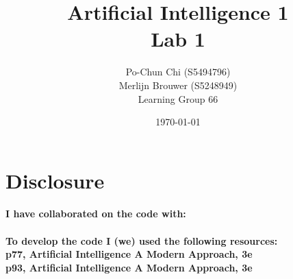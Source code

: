 \documentclass{article}
\title{{\bf Artificial Intelligence 1} \\ Lab 1}%
\author{
Po-Chun Chi (S5494796)
\\
Merlijn Brouwer (S5248949)
\\
Learning Group 66
} %
\date{\today}
\begin{document}
\maketitle

\section*{Disclosure}

\paragraph{I have collaborated on the code with:} 
\paragraph{To develop the code I (we) used the following resources:\\ p77, Artificial Intelligence A Modern Approach, 3e\\ p93, Artificial Intelligence A Modern Approach, 3e
} %
\end{document}
